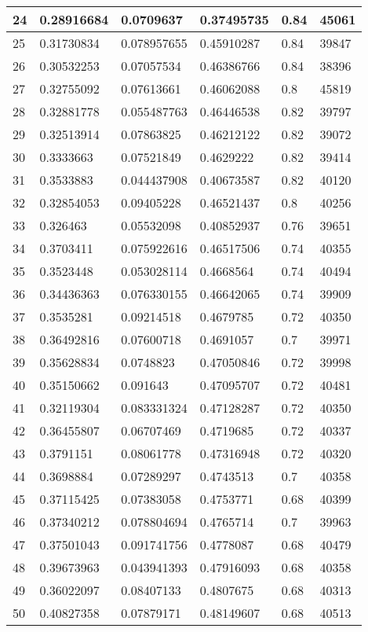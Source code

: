 \begin{longtable}{|l|l|l|l|l|l|}
24 & 0.28916684 & 0.0709637 & 0.37495735 & 0.84 & 45061 \\ \hline 
25 & 0.31730834 & 0.078957655 & 0.45910287 & 0.84 & 39847 \\ \hline 
26 & 0.30532253 & 0.07057534 & 0.46386766 & 0.84 & 38396 \\ \hline 
27 & 0.32755092 & 0.07613661 & 0.46062088 & 0.8 & 45819 \\ \hline 
28 & 0.32881778 & 0.055487763 & 0.46446538 & 0.82 & 39797 \\ \hline 
29 & 0.32513914 & 0.07863825 & 0.46212122 & 0.82 & 39072 \\ \hline 
30 & 0.3333663 & 0.07521849 & 0.4629222 & 0.82 & 39414 \\ \hline 
31 & 0.3533883 & 0.044437908 & 0.40673587 & 0.82 & 40120 \\ \hline 
32 & 0.32854053 & 0.09405228 & 0.46521437 & 0.8 & 40256 \\ \hline 
33 & 0.326463 & 0.05532098 & 0.40852937 & 0.76 & 39651 \\ \hline 
34 & 0.3703411 & 0.075922616 & 0.46517506 & 0.74 & 40355 \\ \hline 
35 & 0.3523448 & 0.053028114 & 0.4668564 & 0.74 & 40494 \\ \hline 
36 & 0.34436363 & 0.076330155 & 0.46642065 & 0.74 & 39909 \\ \hline 
37 & 0.3535281 & 0.09214518 & 0.4679785 & 0.72 & 40350 \\ \hline 
38 & 0.36492816 & 0.07600718 & 0.4691057 & 0.7 & 39971 \\ \hline 
39 & 0.35628834 & 0.0748823 & 0.47050846 & 0.72 & 39998 \\ \hline 
40 & 0.35150662 & 0.091643 & 0.47095707 & 0.72 & 40481 \\ \hline 
41 & 0.32119304 & 0.083331324 & 0.47128287 & 0.72 & 40350 \\ \hline 
42 & 0.36455807 & 0.06707469 & 0.4719685 & 0.72 & 40337 \\ \hline 
43 & 0.3791151 & 0.08061778 & 0.47316948 & 0.72 & 40320 \\ \hline 
44 & 0.3698884 & 0.07289297 & 0.4743513 & 0.7 & 40358 \\ \hline 
45 & 0.37115425 & 0.07383058 & 0.4753771 & 0.68 & 40399 \\ \hline 
46 & 0.37340212 & 0.078804694 & 0.4765714 & 0.7 & 39963 \\ \hline 
47 & 0.37501043 & 0.091741756 & 0.4778087 & 0.68 & 40479 \\ \hline 
48 & 0.39673963 & 0.043941393 & 0.47916093 & 0.68 & 40358 \\ \hline 
49 & 0.36022097 & 0.08407133 & 0.4807675 & 0.68 & 40313 \\ \hline 
50 & 0.40827358 & 0.07879171 & 0.48149607 & 0.68 & 40513 \\ \hline 
\end{longtable}